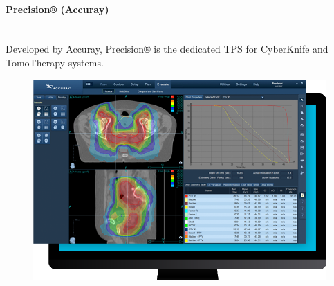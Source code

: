 \Needspace{7cm}
\begin{multicols}{2}
	\paragraph{Precision® (Accuray)}
	\ \\
	Developed by Accuray, Precision® \cite{precision} is the dedicated TPS for CyberKnife and TomoTherapy systems.
	
	\columnbreak
	
	\begin{figure}[H]
		\centering
		\includegraphics[width=\linewidth]{PrecisionAccuray.png}
		\label{peudofig:screenshot_precision}
	\end{figure}
\end{multicols}

